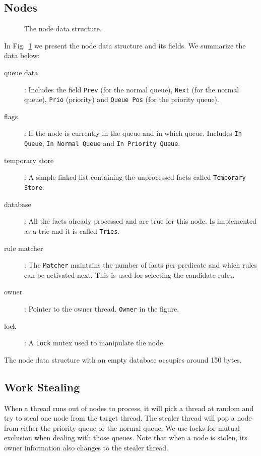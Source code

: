 \subsection{Nodes}

\begin{figure}[h!]
     \centering
    \caption{The node data structure.}
    \label{fig:node}
\end{figure}

In Fig.~\ref{fig:node} we present the node data structure and its fields. We summarize the data below:

\begin{description}
   \item[queue data]: Includes the field \texttt{Prev} (for the normal queue), \texttt{Next} (for the normal queue), \texttt{Prio} (priority) and \texttt{Queue Pos} (for the priority queue).
   \item[flags]: If the node is currently in the queue and in which queue. Includes \texttt{In Queue}, \texttt{In Normal Queue} and \texttt{In Priority Queue}.
   \item[temporary store]: A simple linked-list containing the unprocessed facts called \texttt{Temporary Store}.
   \item[database]: All the facts already processed and are true for this node. Is implemented as a trie and it is called \texttt{Tries}.
   \item[rule matcher]: The \texttt{Matcher} maintains the number of facts per predicate and which rules can be activated next. This is used for selecting the candidate rules.
   \item[owner]: Pointer to the owner thread. \texttt{Owner} in the figure.
   \item[lock]: A \texttt{Lock} mutex used to manipulate the node.
\end{description}

The node data structure with an empty database occupies around 150 bytes.

\subsection{Work Stealing}

When a thread runs out of nodes to process, it will pick a thread at random and try to steal one node
from the target thread. The stealer thread will pop a node from either the priority queue or the normal queue. We use locks for mutual exclusion when dealing with those queues. Note that when a
node is stolen, its owner information also changes to the stealer thread.

